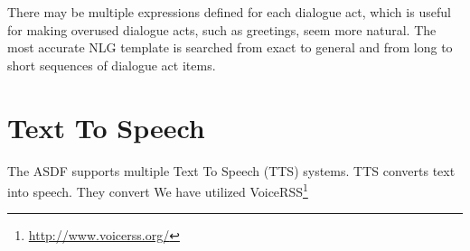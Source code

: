 There may be multiple expressions defined for each dialogue act, which is useful for making overused dialogue acts, such as greetings, seem more natural.
The most accurate NLG template is searched from exact to general and from long to short sequences of dialogue act items.

\section{Text To Speech}

The ASDF supports multiple Text To Speech (TTS) systems.
TTS converts text into speech. They convert
We have utilized VoiceRSS\footnote{\url{http://www.voicerss.org/}}

